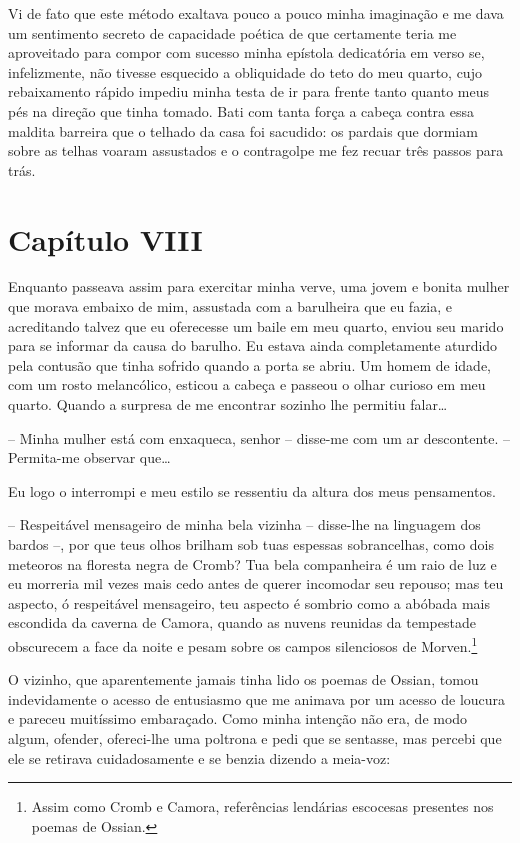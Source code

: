  Vi de fato que este método exaltava pouco a pouco minha imaginação e me
dava um sentimento secreto de capacidade poética de que certamente
teria me aproveitado para compor com sucesso minha epístola dedicatória em
verso se, infelizmente, não tivesse esquecido a obliquidade do teto do
meu quarto, cujo rebaixamento rápido impediu minha testa de ir para
frente tanto quanto meus pés na direção que tinha tomado. Bati com
tanta força a cabeça contra essa maldita barreira que o telhado da casa
foi sacudido: os pardais que dormiam sobre as telhas voaram assustados
e o contragolpe me fez recuar três passos para trás.

\section{Capítulo VIII}

 Enquanto passeava assim para exercitar minha verve, uma jovem e bonita
mulher que morava embaixo de mim, assustada com a barulheira que eu
fazia, e acreditando talvez que eu oferecesse um baile em meu quarto,
enviou seu marido para se informar da causa do barulho. Eu estava ainda
completamente aturdido pela contusão que tinha sofrido quando a porta
se abriu. Um homem de idade, com um rosto melancólico, esticou a cabeça
e passeou o olhar curioso em meu quarto. Quando a surpresa de me
encontrar sozinho lhe permitiu falar\ldots

-- Minha mulher está com enxaqueca, senhor -- disse-me com um ar
descontente. -- Permita-me observar que\ldots

Eu logo o interrompi e meu estilo se ressentiu da altura dos meus
pensamentos. 

-- Respeitável mensageiro de minha bela vizinha -- disse-lhe na
linguagem dos bardos --, por que teus olhos brilham sob tuas espessas
sobrancelhas, como dois meteoros na floresta negra de Cromb? Tua bela
companheira é um raio de luz e eu morreria mil vezes mais cedo antes de
querer incomodar seu repouso; mas teu aspecto, ó respeitável
mensageiro, teu aspecto é sombrio como a abóbada mais escondida da
caverna de Camora, quando as nuvens reunidas da tempestade obscurecem a
face da noite e pesam sobre os campos silenciosos de Morven.\footnote{ Assim 
como Cromb e Camora, referências lendárias escocesas presentes
nos poemas de Ossian.}

O vizinho, que aparentemente jamais tinha lido os poemas de Ossian,
tomou indevidamente o acesso de entusiasmo que me animava por um acesso
de loucura e pareceu muitíssimo embaraçado. Como minha intenção não
era, de modo algum, ofender, ofereci-lhe uma poltrona e pedi que se
sentasse, mas percebi que ele se retirava cuidadosamente e se benzia
dizendo a meia-voz: 


